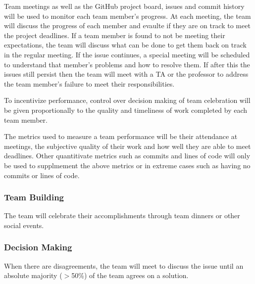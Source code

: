 \documentclass{article}
\begin{document}
Team meetings as well as the GitHub project board, issues and commit history will be used to monitor each team member's progress.
At each meeting, the team will discuss the progress of each member and evaulte if they are on track to meet the project deadlines.
If a team member is found to not be meeting their expectations, the team will discuss what can be done to get them back on track in the regular meeting.
If the issue continues, a special meeting will be scheduled to understand that member's problems and how to resolve them.
If after this the issues still persist then the team will meet with a TA or the professor to address the team member's failure to meet their responsibilities.

To incentivize performance, control over decision making of team celebration will be given proportionally to the quality and timeliness of work completed by each team member.

The metrics used to measure a team performance will be their attendance at meetings, the subjective quality of their work and how well they are able to meet deadlines.
Other quantitivate metrics such as commits and lines of code will only be used to supplmement the above metrics or in extreme cases such as having no commits or lines of code.
\subsubsection*{Team Building}


The team will celebrate their accomplishments through team dinners or other social events.

\subsubsection*{Decision Making} 


When there are disagreements, the team will meet to discuss the issue until an absolute majority ($>$50\%) of the team agrees on a solution.
\end{document}
